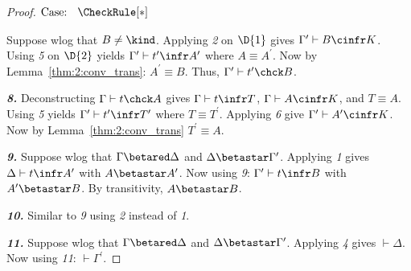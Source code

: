 \begin{proof}
    $\text{Case: }\begin{array}{c} \CheckRule[*] \end{array}$
    \begin{proofcase}
        Suppose wlog that $B \neq \kind$.
        Applying \textit{2} on $\D{1}$ gives $\Gamma^\prime \vdash B \cinfr K$.
        Using \textit{5} on $\D{2}$ yields $\Gamma^\prime \vdash t^\prime \infr A^\prime$ where $A \equiv A^\prime$.
        Now by Lemma~\ref{thm:2:conv_trans}: $A^\prime \equiv B$.
        Thus, $\Gamma^\prime \vdash t^\prime \chck B$.
    \end{proofcase}

    \noindent \textbf{\textit{8.}}
    Deconstructing $\Gamma \vdash t \chck A$ gives $\Gamma \vdash t \infr T$, $\Gamma \vdash A \cinfr K$, and $T \equiv A$.
    Using \textit{5} yields $\Gamma^\prime \vdash t^\prime \infr T^\prime$ where $T \equiv T^\prime$.
    Applying \textit{6} give $\Gamma^\prime \vdash A^\prime \cinfr K$.
    Now by Lemma~\ref{thm:2:conv_trans} $T^\prime \equiv A$.

    \noindent \textbf{\textit{9.}}
    Suppose wlog that $\Gamma \betared \Delta$ and $\Delta \betastar \Gamma^\prime$.
    Applying \textit{1} gives $\Delta \vdash t \infr A^\prime$ with $A \betastar A^\prime$.
    Now using \textit{9}: $\Gamma^\prime \vdash t \infr B$ with $A^\prime \betastar B$.
    By transitivity, $A \betastar B$.

    \noindent \textbf{\textit{10.}}
    Similar to \textit{9} using \textit{2} instead of \textit{1}.

    \noindent \textbf{\textit{11.}}
    Suppose wlog that $\Gamma \betared \Delta$ and $\Delta \betastar \Gamma^\prime$.
    Applying \textit{4} gives $\vdash \Delta$.
    Now using \textit{11}: $\vdash \Gamma^\prime$.


\end{proof}

